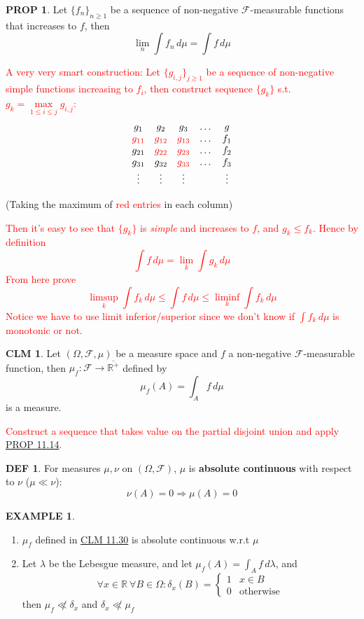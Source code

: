 \documentclass[hidelinks]{article}
\theoremstyle{definition}
\newtheorem*{defin}{DEF}
\newtheorem*{eg}{EXAMPLE}
\theoremstyle{dotless}
\newtheorem{proposition}{PROP}[section]
\newtheorem{claim}{CLM}[section]
\theoremstyle{remark}
\begin{document}
\begin{proposition}\label{PROP 11.14}
Let $\{f_n\}_{n\geq1}$ be a sequence of non-negative $\mathscr{F}$-measurable functions that increases to $f$, then
\[\lim_n\int f_n\,d\mu=\int f\,d\mu\]
\end{proposition}
\textcolor{red}{A very very smart construction: Let $\{g_{i,j}\}_{j\geq1}$ be a sequence of non-negative simple functions increasing to $f_i$, then construct sequence $\{g_k\}$ s.t. $g_k=\max\limits_{1\leq i\leq j}g_{i,j}$:}
$$\begin{matrix}
g_1 & g_2 & g_3 & \dots & g\\
\textcolor{red}{g_{11}} & \textcolor{red}{g_{12}} & \textcolor{red}{g_{13}} & \dots & f_1\\
g_{21} & \textcolor{red}{g_{22}} & \textcolor{red}{g_{23}} & \dots & f_2\\
g_{31} & g_{32} & \textcolor{red}{g_{33}} & \dots & f_3\\
\vdots & \vdots & \vdots & & \vdots
\end{matrix}$$
\begin{center}
    (Taking the maximum of \textcolor{red}{red entries} in each column)
\end{center}
\textcolor{red}{Then it's easy to see that $\{g_k\}$ is \emph{simple} and increases to $f$, and $g_k\leq f_k$. Hence by definition
\[\int f\,d\mu=\lim_k\int g_k\,d\mu\]
From here prove
\[\limsup_k\int f_k\,d\mu\leq\int f\,d\mu\leq\liminf_k\int f_k\,d\mu\]
Notice we have to use limit inferior/superior since we don't know if $\int f_k\,d\mu$ is monotonic or not.}

\begin{claim}\label{CLM 11.30}
Let $(\Omega,\mathscr{F},\mu)$ be a measure space and $f$ a non-negative $\mathscr{F}$-measurable function, then $\mu_f:\mathscr{F}\to\overline{\mathbb{R}^+}$ defined by
\[\mu_f(A)=\int_Af\,d\mu\]
is a measure.
\end{claim}
\textcolor{red}{Construct a sequence that takes value on the partial disjoint union and apply \hyperref[PROP 11.14]{PROP 11.14}.}

\begin{defin}
For measures $\mu,\nu$ on $(\Omega,\mathscr{F})$, $\mu$ is \textbf{absolute continuous} with respect to $\nu$ ($\mu\ll\nu$):
\[\nu(A)=0\Rightarrow\mu(A)=0\]
\end{defin}

\begin{eg}~
\begin{enumerate}[label=\arabic*\degree]
    \item $\mu_f$ defined in \hyperref[CLM 11.30]{CLM 11.30} is absolute continuous w.r.t $\mu$
    \item Let $\lambda$ be the Lebesgue measure, and let $\mu_f(A)=\int_Af\,d\lambda$, and
    \[\forall x\in\mathbb{R}\ \forall B\in\Omega:\delta_x(B)=\begin{cases}
      1 & x\in B\\
      0 & \textrm{otherwise}
    \end{cases}\]
    then $\mu_f\not\ll\delta_x$ and $\delta_x\not\ll\mu_f$
\end{enumerate}
\end{eg}
\end{document}
